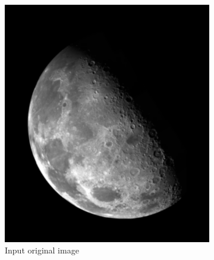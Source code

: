 \documentclass[UTF8]{ctexart}
\begin{document}
\begin{figure}[htbp]
    \centering
    \begin{subfigure}{0.3\textwidth}
        \centering
        \includegraphics[width=\linewidth]{blurry_moon.png}
        \caption{Input original image}
    \end{subfigure}%
    \hspace{0.1\textwidth} %
    \begin{subfigure}{0.3\textwidth}
        \centering

\end{subfigure}
\end{figure}
\end{document}
